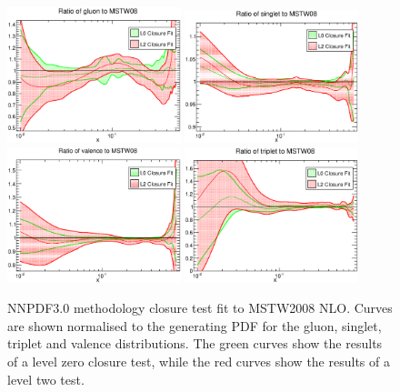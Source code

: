\begin{figure}[!]
\centering
\includegraphics[width=0.45\textwidth]{7-PostLHC/figs/finalClosure/MSTW0/gluon.eps}
\includegraphics[width=0.45\textwidth]{7-PostLHC/figs/finalClosure/MSTW0/singlet.eps}
\includegraphics[width=0.45\textwidth]{7-PostLHC/figs/finalClosure/MSTW0/valence.eps}
\includegraphics[width=0.45\textwidth]{7-PostLHC/figs/finalClosure/MSTW0/triplet.eps}
\caption[NNPDF3.0 methodology closure test fit to MSTW2008 NLO]{NNPDF3.0 methodology closure test fit to MSTW2008 NLO. Curves are shown normalised to the generating PDF for the gluon, singlet, triplet and valence distributions. The green curves show the results of a level zero closure test, while the red curves show the results of a level two test.}
\label{fig:finalClosure_MSTW}
\end{figure}
